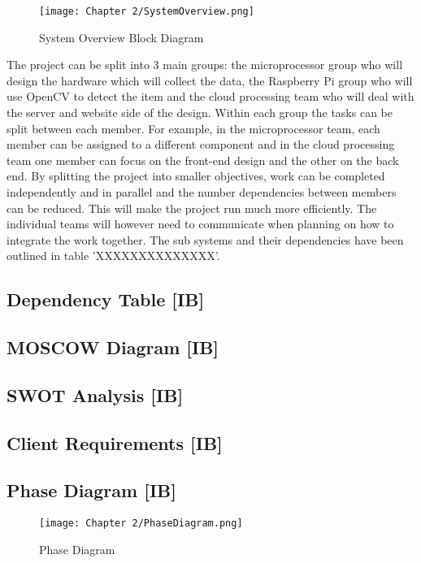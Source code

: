 \begin{figure}[H]        
    \centering
    \texttt{[image: Chapter 2/SystemOverview.png]}
    \caption{System Overview Block Diagram}
    \label{fig:blockdia}
\end{figure} 

The project can be split into 3 main groups: the microprocessor group who will design the hardware which will collect the data, the Raspberry Pi group who will use OpenCV to detect the item and the cloud processing team who will deal with the server and website side of the design.
Within each group the tasks can be split between each member.
For example, in the microprocessor team, each member can be assigned to a different component and in the cloud processing team one member can focus on the front-end design and the other on the back end.
By splitting the project into smaller objectives, work can be completed independently and in parallel and the number dependencies between members can be reduced.
This will make the project run much more efficiently.
The individual teams will however need to communicate when planning on how to integrate the work together.
The sub systems and their dependencies have been outlined in table 'XXXXXXXXXXXXXX'.

\subsection{Dependency Table [IB]}


\subsection{MOSCOW Diagram [IB]}


\subsection{SWOT Analysis [IB]}


\subsection{Client Requirements [IB]}


\subsection{Phase Diagram [IB]}

\begin{figure}[H]        
    \centering
    \texttt{[image: Chapter 2/PhaseDiagram.png]}
    \caption{Phase Diagram}
    \label{fig:phasediag}
\end{figure} 

